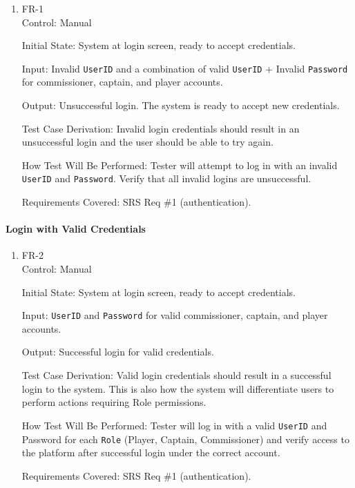 \documentclass[12pt, titlepage]{article}
\begin{document}
\begin{enumerate}
  \item{FR-1\\}
        Control: Manual

        Initial State: System at login screen, ready to accept credentials.

        Input: Invalid \texttt{UserID} and a combination of valid \texttt{UserID} + Invalid \texttt{Password} for commissioner, captain, and player accounts.

        Output: Unsuccessful login. The system is ready to accept new credentials.

        Test Case Derivation: Invalid login credentials should result in an unsuccessful login and the user should be able to try again.

        How Test Will Be Performed: Tester will attempt to log in with an invalid \texttt{UserID} and \texttt{Password}. Verify that all invalid logins are unsuccessful.

        Requirements Covered: SRS Req \#1 (authentication).
\end{enumerate}

\paragraph{Login with Valid Credentials}

\begin{enumerate}

  \item{FR-2\\}
        Control: Manual

        Initial State: System at login screen, ready to accept credentials.

        Input: \texttt{UserID} and \texttt{Password} for valid commissioner, captain, and player accounts.

        Output: Successful login for valid credentials.

        Test Case Derivation: Valid login credentials should result in a successful login to the system. This is also how the system will differentiate users to perform actions requiring Role permissions.

        How Test Will Be Performed: Tester will log in with a valid \texttt{UserID} and Password for each \texttt{Role} (Player, Captain, Commissioner) and verify access to the platform after successful login under the correct account.

        Requirements Covered: SRS Req \#1 (authentication).
\end{enumerate}
\end{document}
